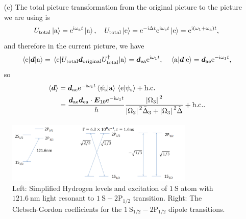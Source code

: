 \documentclass[hyperref, a4paper]{article}
\newcommand*{\ii}{\mathrm{i}}
\newcommand*{\ee}{\mathrm{e}}
\begin{document}
\begin{itemize}
\item[(c)] The total picture transformation from the original picture to the picture we are using is 
\begin{equation}
    U_\text{total} \ket*{\text{a}} = \ee^{\ii \omega_\text{a} t} \ket*{\text{a}}, \quad 
    U_\text{total} \ket*{\text{e}} = \ee^{- \ii \Delta t} \ee^{\ii \omega_\text{e} t} \ket*{\text{e}} = \ee^{\ii (\omega_1 + \omega_\text{a}) t} ,
\end{equation} 
and therefore in the current picture, we have 
\[
    \mel{\text{e}}{\vb*{d}}{\text{a}} = \mel{\text{e}}{U_\text{total} \vb*{d}_\text{original} U_\text{total}^\dagger }{\text{a}} = \vb*{d}_\text{ea} \ee^{\ii \omega_1 t}, \quad \mel{\text{a}}{\vb*{d}}{\text{e}} = \vb*{d}_\text{ae}  \ee^{- \ii \omega_1 t},
\]
so
\begin{equation}
    \begin{aligned}
        \expval*{\vb*{d}} &= \vb*{d}_\text{ae} \ee^{- \ii \omega_1 t} \braket*{\psi_\text{s}}{\text{a}} \braket*{\text{e}}{\psi_\text{s}} + \text{h.c.} \\
        &= \frac{\vb*{d}_\text{ae} \vb*{d}_\text{ea} \cdot \vb*{E}_{10} \ee^{- \ii \omega_1 t} }{\hbar} 
        \frac{\abs*{\Omega_3}^2}{\abs*{\Omega_2}^2 \tilde{\Delta}_3 + \abs*{\Omega_3}^2 \tilde{\Delta}} + \text{h.c.}.
    \end{aligned}
\end{equation}

\end{itemize}

\paragraph{}

\begin{figure}
    \centering
    \includegraphics[width=0.8\textwidth]{fig4.png}
    \caption{Left: Simplified Hydrogen levels and excitation of $1 \mathrm{~S}$ atom with $121.6 \mathrm{~nm}$ light resonant to $1 \mathrm{~S}-2 \mathrm{P}_{1 / 2}$ transition. Right: The Clebsch-Gordon coefficients for the $1 \mathrm{~S}_{1 / 2}-2 \mathrm{P}_{1 / 2}$ dipole transitions.}
    \label{fig:sys-4}
\end{figure}
\end{document}
